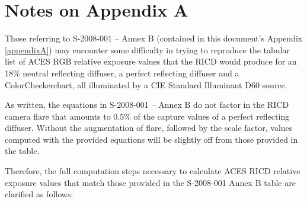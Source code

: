 \numberedformat
\chapter{Notes on Appendix A}

Those referring to S-2008-001 -- Annex B (contained in this document's Appendix \ref{appendixA}) may encounter some difficulty in trying to reproduce the tabular list of ACES RGB relative exposure values that the RICD would produce for an 18\% neutral reflecting diffuser, a perfect reflecting diffuser and a ColorChecker\textregistered chart, all illuminated by a CIE Standard Illuminant D60 source.

As written, the equations in S-2008-001 -- Annex B do not factor in the RICD camera flare that amounts to 0.5\% of the capture values of a perfect reflecting diffuser. Without the augmentation of flare, followed by the scale factor, values computed with the provided equations will be slightly off from those provided in the table.
 
Therefore, the full computation steps necessary to calculate ACES RICD relative exposure values that match those provided in the S-2008-001 Annex B table are clarified as follows:

